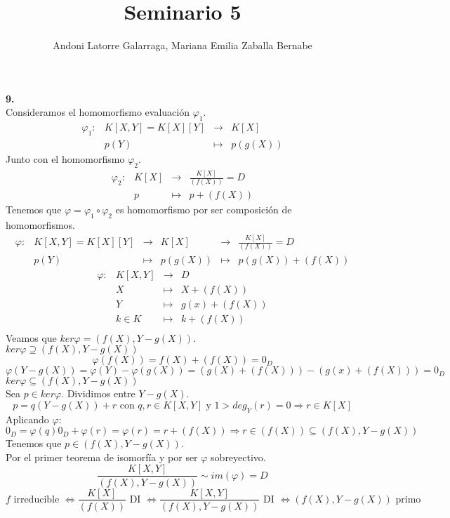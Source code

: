 \documentclass{article}
\title{Seminario 5}
\author{Andoni Latorre Galarraga, Mariana Emilia Zaballa Bernabe}
\date{}
\begin{document}
\maketitle

\noindent \textbf{9.}\\
Consideramos el homomorfismo evaluación $\varphi_1$.
$$
\begin{array}{crcl}
\varphi_1 : & K[X,Y]=K[X][Y] & \longrightarrow & K[X] \\
& p(Y) & \longmapsto     & p(g(X))
\end{array}
$$
Junto con el homomorfismo $\varphi_2$.
$$
\begin{array}{crcl}
\varphi_2 : & K[X] & \longrightarrow & \frac{K[X]}{(f(X))}=D \\
& p & \longmapsto     & p+(f(X))
\end{array}
$$
Tenemos que $\varphi=\varphi_1 \circ \varphi_2$ es homomorfismo por ser composición de homomorfismos.
$$
\begin{array}{crcccl}
\varphi : & K[X,Y]=K[X][Y] & \longrightarrow & K[X] & \longrightarrow & \frac{K[X]}{(f(X))}=D \\
& p(Y) & \longmapsto & p(g(X)) & \longmapsto & p(g(X))+(f(X))
\end{array}
$$
$$
\begin{array}{crcl}
\varphi : & K[X,Y] & \longrightarrow & D \\
& X & \longmapsto & X +(f(X)) \\
& Y & \longmapsto & g(x) +(f(X)) \\
& k\in K & \longmapsto & k +(f(X)) \\
\end{array}
$$
Veamos que $ker\varphi = (f(X), Y-g(X))$.\\
$\boxed{ker\varphi \supseteq (f(X), Y-g(X))}$
$$
\varphi(f(X)) = f(X) +(f(X)) = 0_D
$$
$$
\varphi(Y-g(X)) = \varphi(Y) - \varphi(g(X)) = (g(X)+(f(X))) - (g(x)+(f(X))) = 0_D
$$
$\boxed{ker\varphi \subseteq (f(X), Y-g(X))}$\\
Sea $p\in ker\varphi$. Dividimos entre $Y-g(X)$.
$$
p = q (Y-g(X)) + r \text{ con } q,r\in K[X,Y]  \text{ y } 1>deg_Y(r)=0 \Rightarrow r\in K[X]
$$
Aplicando $\varphi$:
$$
0_D = \varphi(q)0_D + \varphi(r) = \varphi(r) = r + (f(X)) \Rightarrow r \in (f(X))\subseteq (f(X), Y-g(X))
$$
Tenemos que $p\in(f(X), Y-g(X))$.\\
Por el primer teorema de isomorfía y por ser $\varphi$ sobreyectivo.
$$
\frac{K[X,Y]}{(f(X),Y-g(X))} \sim im(\varphi) = D
$$
$$
f \text{ irreducible } \Leftrightarrow
\frac{K[X]}{(f(X))} \text{ DI } \Leftrightarrow
\frac{K[X,Y]}{(f(X), Y-g(X))} \text{ DI } \Leftrightarrow
(f(X), Y-g(X)) \text{ primo}
$$
\end{document}
